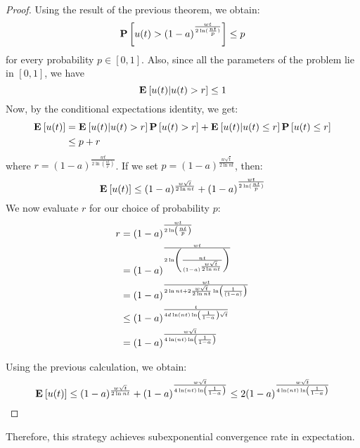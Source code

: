 \begin{proof}
Using the result of the previous theorem, we obtain:
$$ \bm{\mathrm{P}}\left[u(t) > (1-a)^{\frac{wt}{2\ln( \frac{nt}{p})} }\right] \leq p $$
for every probability $p \in [0,1]$. Also, since all the parameters of the problem lie in $[0,1]$, we have 
$$\Exp{u(t)|u(t) > r} \leq 1$$
Now, by the conditional expectations identity, we get:
\begin{align*}
\Exp{u(t)} &= \Exp{u(t)|u(t) > r}\Prob{u(t) > r} +\Exp{u(t)|u(t) \leq r}\Prob{u(t) \leq r}\\
&\leq p + r 
\end{align*}
where $r = (1-a)^{\frac{wt}{2\ln( \frac{nt}{p})} }$. If we set $p = (1-a)^{\frac{w\sqrt{t}}{2\ln nt}}$, then:
$$
\Exp{u(t)} \leq (1-a)^{\frac{w\sqrt{t}}{2\ln nt}} + (1-a)^{\frac{wt}{2\ln( \frac{nt}{p})} }
$$
We now evaluate $r$ for our choice of probability $p$:
\begin{align*}
r 
&= (1-a)^{\frac{wt}{2\ln\left( \frac{nt}{p}\right)} }\\
&= (1-a)^{\frac{wt}{2\ln\left( \frac{nt}{(1-a)^{\frac{w\sqrt{t}}{2\ln nt}}}\right)} }\\
&= (1-a)^{\frac{wt}{2\ln nt + 2\frac{w\sqrt{t}}{2\ln nt}\ln\left( \frac{1}{(1-a)}\right) }}\\
&\leq (1-a)^{\frac{t}{4d\ln(nt)\ln\left( \frac{1}{1-a}\right) \sqrt{t}}}\\
&= (1-a)^{\frac{w\sqrt{t}}{4\ln(nt)\ln\left( \frac{1}{1-a}\right)}}
\end{align*}

Using the previous calculation, we obtain:
$$ \Exp{u(t)} \leq (1-a)^{\frac{w\sqrt{t}}{2\ln nt}} + (1-a)^{\frac{w\sqrt{t}}{4\ln(nt)\ln\lp( \frac{1}{1-a}\rp)}} \leq 2(1-a)^{\frac{w\sqrt{t}}{4\ln(nt)\ln\lp( \frac{1}{1-a}\rp)}}$$
\end{proof}
Therefore, this strategy achieves subexponential convergence rate in expectation. 
